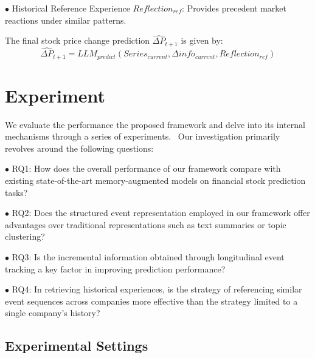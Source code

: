 \documentclass[sigconf, nonacm]{acmart} %
\begin{document}
$\bullet$ Historical Reference Experience $Reflection_{ref}$: Provides precedent market reactions under similar patterns.

The final stock price change prediction $\hat{\Delta P}_{t+1}$ is given by:
\begin{equation}
\hat{\Delta P}_{t+1} = LLM_{predict}(Series_{current}, \Delta info_{current}, Reflection_{ref})
\end{equation}

\section{Experiment}
We evaluate the performance the proposed framework and delve into its internal mechanisms through a series of experiments.  Our investigation primarily revolves around the following questions:

$\bullet$ RQ1: How does the overall performance of our framework compare with existing state-of-the-art memory-augmented models on financial stock prediction tasks?

$\bullet$ RQ2: Does the structured event representation employed in our framework offer advantages over traditional representations such as text summaries or topic clustering?

$\bullet$ RQ3: Is the incremental information obtained through longitudinal event tracking a key factor in improving prediction performance?

$\bullet$ RQ4: In retrieving historical experiences, is the strategy of referencing similar event sequences across companies more effective than the strategy limited to a single company's history?
\subsection{Experimental Settings}
\end{document}
